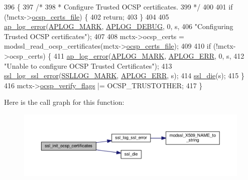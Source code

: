 \begin{DoxyCode}
396 \{
397     \textcolor{comment}{/*}
398 \textcolor{comment}{     * Configure Trusted OCSP certificates.}
399 \textcolor{comment}{     */}
400 
401     \textcolor{keywordflow}{if} (!mctx->\hyperlink{structmodssl__ctx__t_ab9a17529e353f5a2786b7c9af8641bbe}{ocsp\_certs\_file}) \{
402         \textcolor{keywordflow}{return};
403     \}
404 
405     \hyperlink{group__APACHE__CORE__LOG_ga5e6676c87418af7a1d323a116c78ecb4}{ap\_log\_error}(\hyperlink{group__APACHE__CORE__LOG_ga655e126996849bcb82e4e5a14c616f4a}{APLOG\_MARK}, \hyperlink{group__APACHE__CORE__LOG_gadfcef90537539cf2b7d35cfbbbafeb93}{APLOG\_DEBUG}, 0, s,
406                  \textcolor{stringliteral}{"Configuring Trusted OCSP certificates"});
407 
408     mctx->ocsp\_certs = modssl\_read\_ocsp\_certificates(mctx->\hyperlink{structmodssl__ctx__t_ab9a17529e353f5a2786b7c9af8641bbe}{ocsp\_certs\_file});
409 
410     \textcolor{keywordflow}{if} (!mctx->ocsp\_certs) \{
411         \hyperlink{group__APACHE__CORE__LOG_ga5e6676c87418af7a1d323a116c78ecb4}{ap\_log\_error}(\hyperlink{group__APACHE__CORE__LOG_ga655e126996849bcb82e4e5a14c616f4a}{APLOG\_MARK}, \hyperlink{group__APACHE__CORE__LOG_ga57ad94ed8c92c4306de90479251a5d58}{APLOG\_ERR}, 0, s,
412                 \textcolor{stringliteral}{"Unable to configure OCSP Trusted Certificates"});
413         \hyperlink{group__MOD__SSL__PRIVATE_ga9a4071d17f72df0574d3c8840886d3bb}{ssl\_log\_ssl\_error}(\hyperlink{group__MOD__SSL__PRIVATE_ga0e50481cba5952ce59ad2c103f8128a4}{SSLLOG\_MARK}, \hyperlink{group__APACHE__CORE__LOG_ga57ad94ed8c92c4306de90479251a5d58}{APLOG\_ERR}, s);
414         \hyperlink{group__MOD__SSL__PRIVATE_ga0b838c35368b66371405810027c63b04}{ssl\_die}(s);
415     \}
416     mctx->\hyperlink{structmodssl__ctx__t_a9d0a77e4a5041249f30ce3f7fc4187ca}{ocsp\_verify\_flags} |= OCSP\_TRUSTOTHER;
417 \}
\end{DoxyCode}


Here is the call graph for this function\+:
\nopagebreak
\begin{figure}[H]
\begin{center}
\leavevmode
\includegraphics[width=350pt]{group__MOD__SSL__PRIVATE_gafd4f4e800eec373cf92da32610897efc_cgraph}
\end{center}
\end{figure}




